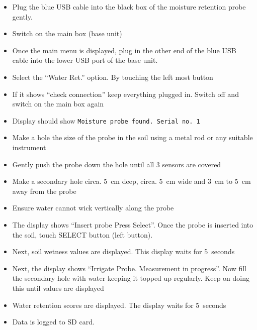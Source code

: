 \begin{itemize}
\item Plug the blue USB cable into the black box of the moisture retention probe gently.
\item Switch on the main box (base unit) 
\item Once the main menu is displayed, plug in the other end of the blue USB cable into the lower USB port of the base unit.  
\item Select the “Water Ret.” option. By touching the left most button
\item If it shows “check connection” keep everything plugged in. Switch off and switch on the main box again    
\item Display should show \texttt{Moisture probe found. Serial no. 1}
\item Make a hole the size of the probe in the soil using a metal rod or any suitable instrument 
\item Gently push the probe down the hole until all 3 sensors are covered 
\item Make a secondary hole circa. \SI{5}{cm} deep, circa. \SI{5}{cm} wide and \SI{3}{cm} to \SI{5}{cm} away from the probe 
\item Ensure water cannot wick vertically along the probe 
\item The display shows “Insert probe Press Select”. Once the probe is inserted into the soil, touch SELECT button (left button).  
\item Next, soil wetness values are displayed. This display waits for \SI{5}{seconds}
\item Next, the display shows “Irrigate Probe. Measurement in progress”. Now fill the secondary hole with water keeping it topped up regularly. Keep on doing this until values are displayed 
\item Water retention scores are displayed. The display waits for \SI{5}{seconds} 
\item Data is logged to SD card. 
\end{itemize}




